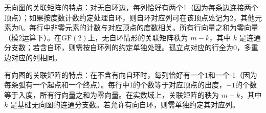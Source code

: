 无向图的关联矩阵的特点：对无自环边，每列恰好有两个1（因为每条边连接两个顶点）；如果按度数计数约定处理自环，则自环对应列可在该顶点处记为2，其他元素为0。每行中非零元素的计数与对应顶点的度数相关。所有行向量之和为零向量（模2运算下）。在$\mathrm{GF}(2)$上，无自环情形的关联矩阵秩为 $m - k$，其中 $k$ 是连通分支数；若含自环，则需按自环列的约定单独处理。孤立点对应的行全为0，多重边对应的列相同。

有向图的关联矩阵的特点：在不含有向自环时，每列恰好有一个1和一个-1（因为每条弧有一个起点和一个终点）。每行中1的个数等于对应顶点的出度，$-1$的个数等于入度，所有行向量之和为零向量。在实数域上，关联矩阵的秩为 $m - k$，其中 $k$ 是基础无向图的连通分支数。若允许有向自环，则需单独约定其对应列。














\newpage
